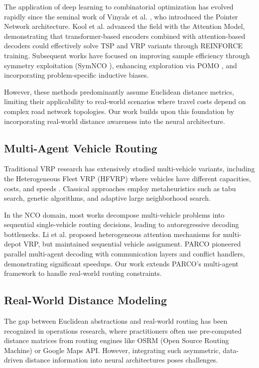 \documentclass[lettersize,journal]{IEEEtran}
\begin{document}
The application of deep learning to combinatorial optimization has evolved rapidly since the seminal work of Vinyals et al. \cite{vinyals2015pointer}, who introduced the Pointer Network architecture. Kool et al. \cite{kool2018attention} advanced the field with the Attention Model, demonstrating that transformer-based encoders combined with attention-based decoders could effectively solve TSP and VRP variants through REINFORCE training. Subsequent works have focused on improving sample efficiency through symmetry exploitation (SymNCO \cite{kim2022symnco}), enhancing exploration via POMO \cite{kwon2020pomo}, and incorporating problem-specific inductive biases.

However, these methods predominantly assume Euclidean distance metrics, limiting their applicability to real-world scenarios where travel costs depend on complex road network topologies. Our work builds upon this foundation by incorporating real-world distance awareness into the neural architecture.

\subsection{Multi-Agent Vehicle Routing}

Traditional VRP research has extensively studied multi-vehicle variants, including the Heterogeneous Fleet VRP (HFVRP) where vehicles have different capacities, costs, and speeds \cite{taillard1999heuristic}. Classical approaches employ metaheuristics such as tabu search, genetic algorithms, and adaptive large neighborhood search.

In the NCO domain, most works decompose multi-vehicle problems into sequential single-vehicle routing decisions, leading to autoregressive decoding bottlenecks. Li et al. \cite{li2021learning} proposed heterogeneous attention mechanisms for multi-depot VRP, but maintained sequential vehicle assignment. PARCO \cite{berto2025parco} pioneered parallel multi-agent decoding with communication layers and conflict handlers, demonstrating significant speedups. Our work extends PARCO's multi-agent framework to handle real-world routing constraints.

\subsection{Real-World Distance Modeling}

The gap between Euclidean abstractions and real-world routing has been recognized in operations research, where practitioners often use pre-computed distance matrices from routing engines like OSRM (Open Source Routing Machine) or Google Maps API. However, integrating such asymmetric, data-driven distance information into neural architectures poses challenges.
\end{document}

